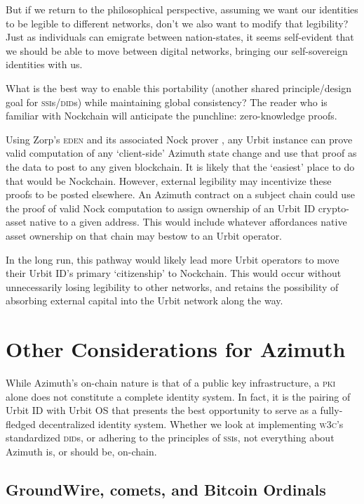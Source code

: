 \documentclass[twoside]{article}
\begin{document}
But if we return to the philosophical perspective, assuming we want our identities to be legible to different networks, don't we also want to modify that legibility? Just as individuals can emigrate between nation-states, it seems self-evident that we should be able to move between digital networks, bringing our self-sovereign identities with us.

What is the best way to enable this portability (another shared principle/design goal for \textsc{ssi}s/\textsc{did}s) while maintaining global consistency? The reader who is familiar with Nockchain will anticipate the punchline:  zero-knowledge proofs.

Using Zorp's \textsc{eden} and its associated Nock prover \citep{Zorp2023}, any Urbit instance can prove valid computation of any `client-side' Azimuth state change and use that proof as the data to post to any given blockchain. It is likely that the `easiest' place to do that would be Nockchain. However, external legibility may incentivize these proofs to be posted elsewhere. An Azimuth contract on a subject chain could use the proof of valid Nock computation to assign ownership of an Urbit ID crypto-asset native to a given address. This would include whatever affordances native asset ownership on that chain may bestow to an Urbit operator.

In the long run, this pathway would likely lead more Urbit operators to move their Urbit ID's primary `citizenship' to Nockchain. This would occur without unnecessarily losing legibility to other networks, and retains the possibility of absorbing external capital into the Urbit network along the way.


\section{Other Considerations for Azimuth}

While Azimuth's on-chain nature is that of a public key infrastructure, a \textsc{pki} alone does not constitute a complete identity system. In fact, it is the pairing of Urbit ID with Urbit OS that presents the best opportunity to serve as a fully-fledged decentralized identity system. Whether we look at implementing \textsc{w3c}'s standardized \textsc{did}s, or adhering to the principles of \textsc{ssi}s, not everything about Azimuth is, or should be, on-chain.

\subsection{GroundWire, comets, and Bitcoin Ordinals}
\end{document}
